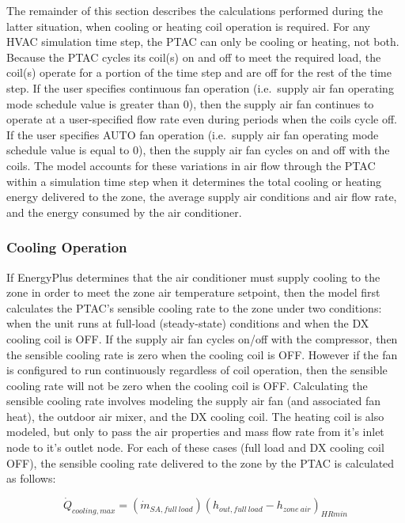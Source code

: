The remainder of this section describes the calculations performed during the latter situation, when cooling or heating coil operation is required. For any HVAC simulation time step, the PTAC can only be cooling or heating, not both. Because the PTAC cycles its coil(s) on and off to meet the required load, the coil(s) operate for a portion of the time step and are off for the rest of the time step. If the user specifies continuous fan operation (i.e.~supply air fan operating mode schedule value is greater than 0), then the supply air fan continues to operate at a user-specified flow rate even during periods when the coils cycle off. If the user specifies AUTO fan operation (i.e.~supply air fan operating mode schedule value is equal to 0), then the supply air fan cycles on and off with the coils. The model accounts for these variations in air flow through the PTAC within a simulation time step when it determines the total cooling or heating energy delivered to the zone, the average supply air conditions and air flow rate, and the energy consumed by the air conditioner.

\subsubsection{Cooling Operation}\label{cooling-operation-001}

If EnergyPlus determines that the air conditioner must supply cooling to the zone in order to meet the zone air temperature setpoint, then the model first calculates the PTAC's sensible cooling rate to the zone under two conditions: when the unit runs at full-load (steady-state) conditions and when the DX cooling coil is OFF. If the supply air fan cycles on/off with the compressor, then the sensible cooling rate is zero when the cooling coil is OFF. However if the fan is configured to run continuously regardless of coil operation, then the sensible cooling rate will not be zero when the cooling coil is OFF. Calculating the sensible cooling rate involves modeling the supply air fan (and associated fan heat), the outdoor air mixer, and the DX cooling coil. The heating coil is also modeled, but only to pass the air properties and mass flow rate from it's inlet node to it's outlet node. For each of these cases (full load and DX cooling coil OFF), the sensible cooling rate delivered to the zone by the PTAC is calculated as follows:

\begin{equation}
  \dot{Q}_{cooling,max} = \left( \dot{m}_{SA,full~load} \right) \left( h_{out,full~load} - h_{zone~air} \right)_{HRmin}
\end{equation}

